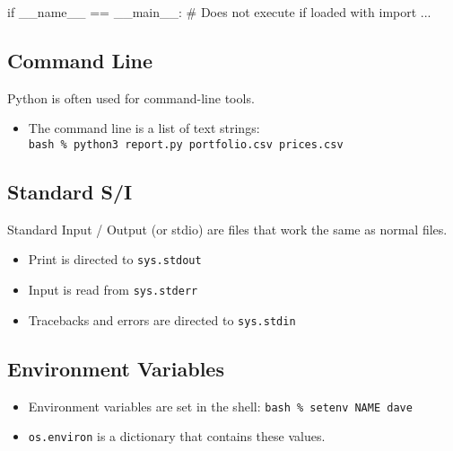 \documentclass[
  letterpaper,
  DIV=11,
  numbers=noendperiod]{scrreprt}
\newenvironment{Shaded}{\begin{snugshade}}{\end{snugshade}}
\newcommand{\CommentTok}[1]{\textcolor[rgb]{0.37,0.37,0.37}{#1}}
\newcommand{\ControlFlowTok}[1]{\textcolor[rgb]{0.00,0.46,0.62}{#1}}
\newcommand{\NormalTok}[1]{\textcolor[rgb]{0.00,0.46,0.62}{#1}}
\newcommand{\OperatorTok}[1]{\textcolor[rgb]{0.37,0.37,0.37}{#1}}
\newcommand{\StringTok}[1]{\textcolor[rgb]{0.13,0.47,0.30}{#1}}
\newcommand{\VariableTok}[1]{\textcolor[rgb]{0.07,0.07,0.07}{#1}}
\providecommand{\tightlist}{%
  \setlength{\itemsep}{0pt}\setlength{\parskip}{0pt}}
\begin{document}
\begin{Shaded}
\begin{Highlighting}[]
\ControlFlowTok{if} \VariableTok{\_\_name\_\_} \OperatorTok{==} \StringTok{\textquotesingle{}\_\_main\_\_\textquotesingle{}}\NormalTok{:}
    \CommentTok{\# Does not execute if loaded with import ...}
\end{Highlighting}
\end{Shaded}

\hypertarget{command-line}{%
\subsection{Command Line}\label{command-line}}

Python is often used for command-line tools.

\begin{itemize}
\tightlist
\item
  The command line is a list of text strings:
  \texttt{bash\ \%\ python3\ report.py\ portfolio.csv\ prices.csv}
\end{itemize}

\hypertarget{standard-si}{%
\subsection{Standard S/I}\label{standard-si}}

Standard Input / Output (or stdio) are files that work the same as
normal files.

\begin{itemize}
\tightlist
\item
  Print is directed to \texttt{sys.stdout}
\item
  Input is read from \texttt{sys.stderr}
\item
  Tracebacks and errors are directed to \texttt{sys.stdin}
\end{itemize}

\hypertarget{environment-variables}{%
\subsection{Environment Variables}\label{environment-variables}}

\begin{itemize}
\tightlist
\item
  Environment variables are set in the shell:
  \texttt{bash\ \%\ setenv\ NAME\ dave}
\item
  \texttt{os.environ} is a dictionary that contains these values.
\end{itemize}
\end{document}
